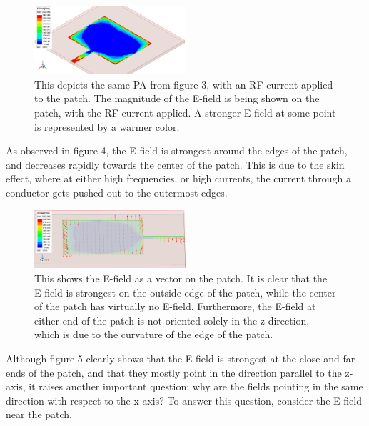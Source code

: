 \documentclass[12pt]{article}
\begin{document}
\begin{figure}[h]
    \centering
    \includegraphics[width=0.5\textwidth]{basic-patch-antenna-MagE-on-patch.png}
    \caption{This depicts the same PA from figure 3, with an RF current applied to the patch. The magnitude of the E-field is being shown on the patch, with the RF current applied. A stronger E-field at some point is represented by a warmer color.}
\end{figure}

As observed in figure 4, the E-field is strongest around the edges of the patch, and decreases rapidly towards the center of the patch. This is due to the skin effect, where at either high frequencies, or high currents, the current through a conductor gets pushed out to the outermost edges. 

\begin{figure}[h]
    \centering
    \includegraphics[width=0.5\textwidth]{basic-patch-antenna-VecE-onPatch-t0.png}
    \caption{This shows the E-field as a vector on the patch. It is clear that the E-field is strongest on the outside edge of the patch, while the center of the patch has virtually no E-field. Furthermore, the E-field at either end of the patch is not oriented solely in the z direction, which is due to the curvature of the edge of the patch.}
\end{figure}

Although figure 5 clearly shows that the E-field is strongest at the close and far ends of the patch, and that they mostly point in the direction parallel to the z-axis, it raises another important question: why are the fields pointing in the same direction with respect to the x-axis? To answer this question, consider the E-field near the patch.  
\end{document}

